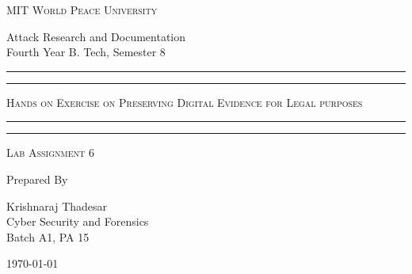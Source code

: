 \documentclass[11pt]{article}
\begin{document}
\begin{titlepage}
	\centering


	\huge\textsc{
		MIT World Peace University
	}\\

	\vspace{0.75\baselineskip} %

	\LARGE{
		Attack Research and Documentation\\
		Fourth Year B. Tech, Semester 8
	}

	\vfill %


	\rule{\textwidth}{1.6pt}\vspace*{-\baselineskip}\vspace*{2pt}
	\rule{\textwidth}{0.6pt}
	\vspace{0.75\baselineskip} %

	\huge{\textsc{
        Hands on Exercise on Preserving Digital Evidence for Legal purposes
    }} \\

	\vspace{0.5\baselineskip} %
	\rule{\textwidth}{0.6pt}\vspace*{-\baselineskip}\vspace*{2.8pt}
	\rule{\textwidth}{1.6pt}

	\vspace{1\baselineskip} %


	\LARGE\textsc{
		Lab Assignment 6
	} %
	\vfill


	Prepared By \vspace{0.5\baselineskip} %

	\Large{
		Krishnaraj Thadesar \\
		Cyber Security and Forensics\\
        Batch A1, PA 15
	}

	\vspace{0.5\baselineskip} %
	\today

\end{titlepage}
\end{document}
